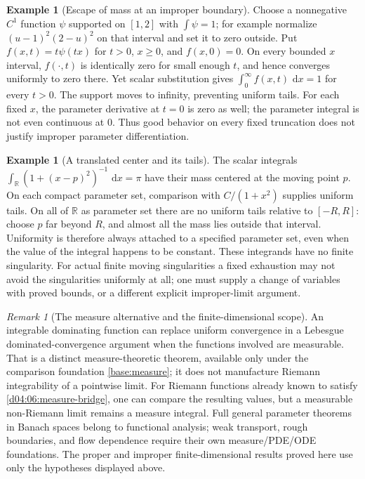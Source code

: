 \documentclass[11pt,oneside,openany]{book}
\theoremstyle{definition}
\newtheorem{example}[theorem]{Example}
\theoremstyle{remark}
\newtheorem{remark}[theorem]{Remark}
\newcounter{foundation}
\newcommand{\R}{\mathbb R}
\newcommand{\dd}{\,\mathrm d}
\begin{document}
\begin{example}[Escape of mass at an improper boundary]\label{d04:08:escape}
Choose a nonnegative $C^1$ function $\psi$ supported on $[1,2]$ with $\int\psi=1$; for example normalize $(u-1)^2(2-u)^2$ on that interval and set it to zero outside. Put $f(x,t)=t\psi(tx)$ for $t>0$, $x\geq0$, and $f(x,0)=0$. On every bounded $x$ interval, $f(\cdot,t)$ is identically zero for small enough $t$, and hence converges uniformly to zero there. Yet scalar substitution gives $\int_0^\infty f(x,t)\,\dd x=1$ for every $t>0$. The support moves to infinity, preventing uniform tails. For each fixed $x$, the parameter derivative at $t=0$ is zero as well; the parameter integral is not even continuous at $0$. Thus good behavior on every fixed truncation does not justify improper parameter differentiation.
\end{example}

\begin{example}[A translated center and its tails]\label{d04:08:moving-singularity}
The scalar integrals $\int_{\R}(1+(x-p)^2)^{-1}\,\dd x=\pi$ have their mass centered at the moving point $p$. On each compact parameter set, comparison with $C/(1+x^2)$ supplies uniform tails. On all of $\R$ as parameter set there are no uniform tails relative to $[-R,R]$: choose $p$ far beyond $R$, and almost all the mass lies outside that interval. Uniformity is therefore always attached to a specified parameter set, even when the value of the integral happens to be constant. These integrands have no finite singularity. For actual finite moving singularities a fixed exhaustion may not avoid the singularities uniformly at all; one must supply a change of variables with proved bounds, or a different explicit improper-limit argument.
\end{example}

\begin{remark}[The measure alternative and the finite-dimensional scope]\label{d04:08:measure-alternative}
An integrable dominating function can replace uniform convergence in a Lebesgue dominated-convergence argument when the functions involved are measurable. That is a distinct measure-theoretic theorem, available only under the comparison foundation \cref{base:measure}; it does not manufacture Riemann integrability of a pointwise limit. For Riemann functions already known to satisfy \cref{d04:06:measure-bridge}, one can compare the resulting values, but a measurable non-Riemann limit remains a measure integral. Full general parameter theorems in Banach spaces belong to functional analysis; weak transport, rough boundaries, and flow dependence require their own measure/PDE/ODE foundations. The proper and improper finite-dimensional results proved here use only the hypotheses displayed above.
\end{remark}
\end{document}
